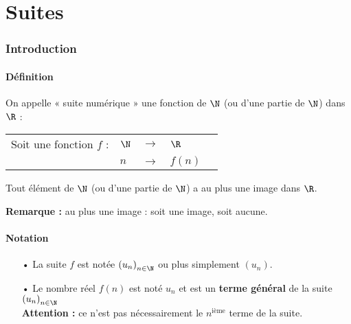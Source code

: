 \ifdefined\COMPLETE
\else
    
    
    \usepackage{texgraph}
    
    
\fi


\setcounter{section}{0}

\part{Suites}

\section{Introduction}

\subsection{Définition}

On appelle « suite numérique » une fonction de $\N$ (ou d'une partie de $\N$) dans $\R$ : \\

\begin{tabular}{lllll}
Soit une fonction $f$ : & $\N$ & $\longrightarrow$ & $\R$ \\
& $n$ & $\longrightarrow$ & $f\left(n\right)$ \\ 
\end{tabular}

\vspace*{.3cm}

Tout élément de $\N$ (ou d'une partie de $\N$) a au plus une image dans $\R$.

\textbf{Remarque :} au plus une image : soit une image, soit aucune. 

\subsection{Notation}

\begin{itemize}
\item[•] La suite $f$ est notée $\left(u_n\right)_{n \in \N}$ ou plus simplement $\left(u_n\right)$. \\

\item[•] Le nombre réel $f\left(n\right)$ est noté $u_n$ et est un \textbf{terme général} de la suite $\left(u_n\right)_{n \in \N}$ \\

\textbf{Attention :} ce n'est pas nécessairement le $n^\mathrm{ième}$ terme de la suite. 
\end{itemize}


